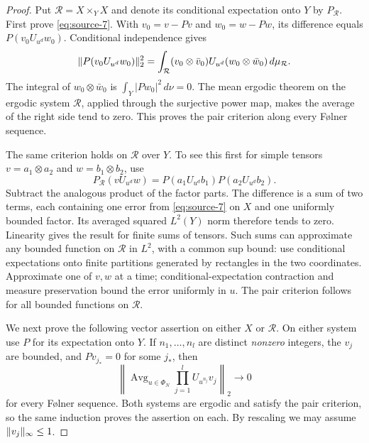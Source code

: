 \begin{proof}
Put $\mathcal R=X\times_YX$ and denote its conditional expectation onto
$Y$ by $P_{\mathcal R}$.  First prove \eqref{eq:source-7}.  With
$v_0=v-Pv$ and $w_0=w-Pw$, its difference equals
$P(v_0U_{u^d}w_0)$.  Conditional independence gives
\begin{equation}\label{eq:rigidity-pair-tensor}
 \lVert P(v_0U_{u^d}w_0)\rVert_2^2
 =\int_{\mathcal R}(v_0\otimes\bar v_0)
       U_{u^d}(w_0\otimes\bar w_0)\,d\mu_{\mathcal R}.
\end{equation}
The integral of $w_0\otimes\bar w_0$ is
$\int_Y|Pw_0|^2\,d\nu=0$.  The mean ergodic theorem on the ergodic
system $\mathcal R$, applied through the surjective power map, makes
the average of the right side tend to zero.  This proves the pair
criterion along every F\o lner sequence.

The same criterion holds on $\mathcal R$ over $Y$.  To see this first
for simple tensors $v=a_1\otimes a_2$ and $w=b_1\otimes b_2$, use
\[
 P_{\mathcal R}(vU_{u^d}w)
 =P(a_1U_{u^d}b_1)P(a_2U_{u^d}b_2).
\]
Subtract the analogous product of the factor parts.  The difference is
a sum of two terms, each containing one error from
\eqref{eq:source-7} on $X$ and one uniformly bounded factor.  Its
averaged squared $L^2(Y)$ norm therefore tends to zero.  Linearity gives
the result for finite sums of tensors.  Such sums can approximate any
bounded function on $\mathcal R$ in $L^2$, with a common sup bound:
use conditional expectations onto finite partitions generated by
rectangles in the two coordinates.  Approximate one of $v,w$ at a time;
conditional-expectation contraction and measure preservation bound the
error uniformly in $u$.  The pair criterion follows for all bounded
functions on $\mathcal R$.

We next prove the following vector assertion on either $X$ or
$\mathcal R$.  On either system use $P$ for its expectation onto $Y$.
If $n_1,\ldots,n_l$ are distinct \emph{nonzero} integers, the $v_j$ are
bounded, and $Pv_{j_*}=0$ for some $j_*$, then
\begin{equation}\label{eq:rigidity-centered-vector}
 \left\|\operatorname{Avg}_{u\in\Phi_N}
          \prod_{j=1}^lU_{u^{n_j}}v_j\right\|_2\longrightarrow0
\end{equation}
for every F\o lner sequence.  Both systems are ergodic and satisfy the
pair criterion, so the same induction proves the assertion on each.
By rescaling we may assume $\lVert v_j\rVert_\infty\leq1$.


\end{proof}
